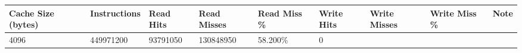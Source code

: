 \documentclass[11pt]{article}
\begin{document}
\begin{longtable}[]{@{}lllllllll@{}}
\toprule
\begin{minipage}[b]{0.12\columnwidth}\raggedright\strut
Cache Size (bytes)\strut
\end{minipage} & \begin{minipage}[b]{0.09\columnwidth}\raggedright\strut
Instructions\strut
\end{minipage} & \begin{minipage}[b]{0.07\columnwidth}\raggedright\strut
Read Hits\strut
\end{minipage} & \begin{minipage}[b]{0.08\columnwidth}\raggedright\strut
Read Misses\strut
\end{minipage} & \begin{minipage}[b]{0.08\columnwidth}\raggedright\strut
Read Miss \%\strut
\end{minipage} & \begin{minipage}[b]{0.08\columnwidth}\raggedright\strut
Write Hits\strut
\end{minipage} & \begin{minipage}[b]{0.09\columnwidth}\raggedright\strut
Write Misses\strut
\end{minipage} & \begin{minipage}[b]{0.09\columnwidth}\raggedright\strut
Write Miss \%\strut
\end{minipage} & \begin{minipage}[b]{0.06\columnwidth}\raggedright\strut
Note\strut
\end{minipage}\tabularnewline
\midrule
\endhead
\begin{minipage}[t]{0.12\columnwidth}\raggedright\strut
4096\strut
\end{minipage} & \begin{minipage}[t]{0.09\columnwidth}\raggedright\strut
449971200\strut
\end{minipage} & \begin{minipage}[t]{0.07\columnwidth}\raggedright\strut
93791050\strut
\end{minipage} & \begin{minipage}[t]{0.08\columnwidth}\raggedright\strut
130848950\strut
\end{minipage} & \begin{minipage}[t]{0.08\columnwidth}\raggedright\strut
58.200\%\strut
\end{minipage} & \begin{minipage}[t]{0.08\columnwidth}\raggedright\strut
0\strut

\end{minipage}
\end{longtable}
\end{document}

